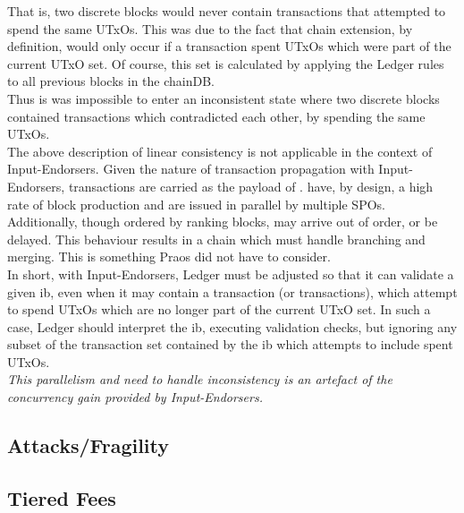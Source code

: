 \documentclass[11pt,a4paper]{article}
\begin{document}
That is, two discrete blocks would never contain transactions that attempted to spend the same UTxOs. This was due 
to the fact that chain extension, by definition, would only occur if a transaction spent UTxOs which were part of the 
current UTxO set. Of course, this set is calculated by applying the Ledger rules to all previous blocks in the 
chainDB.\\

Thus is was impossible to enter an inconsistent state where two discrete blocks contained transactions which 
contradicted each other, by spending the same UTxOs. \\

The above description of linear consistency is not applicable in the context of Input-Endorsers. Given the nature of 
transaction propagation with Input-Endorsers, transactions are carried as the payload of . 
have, by design, a high rate of block production and are issued in parallel by multiple SPOs. Additionally, 
 though ordered by ranking blocks, may arrive out of order, or be delayed. This behaviour results in a 
chain which must handle branching and merging. This is something Praos did not have to consider. \\

In short, with Input-Endorsers, Ledger must be adjusted so that it can validate a given \gls{ib}, even when it may 
contain a transaction (or transactions), which attempt to spend UTxOs which are no longer part of the current UTxO set.
In such a case, Ledger should interpret the \gls{ib}, executing validation checks, but ignoring any subset of the 
transaction set contained by the \gls{ib} which attempts to include spent UTxOs. \\

\emph{This parallelism and need to handle inconsistency is an artefact of the concurrency gain provided by 
Input-Endorsers.}


\subsection{Attacks/Fragility}

\subsection{Tiered Fees}
\end{document}
